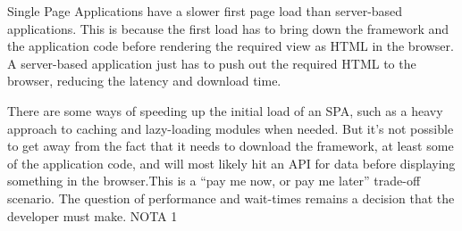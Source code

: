Single Page Applications have a slower first page load than server-based applications. This is because the first load has to bring down the framework and the application code before rendering the required view as HTML in the browser. A server-based application just has to push out the required HTML to the browser, reducing the latency and download time.


There are some ways of speeding up the initial load of an SPA, such as a heavy approach to caching and lazy-loading modules when needed. But it's not possible to get away from the fact that it needs to download the framework, at least some of the application code, and will most likely hit an API for data before displaying something in the browser.This is a ``pay me now, or pay me later'' trade-off scenario. The question of performance and wait-times remains a decision that the developer must make.
NOTA 1

